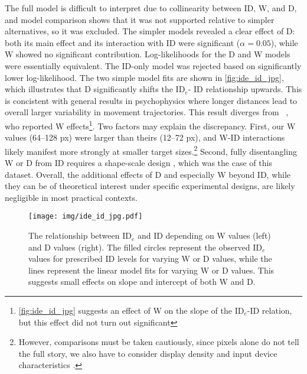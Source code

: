 \documentclass[acmlarge, manuscript,review]{acmart}
\newcommand{\ide}{\ensuremath{{\text{ID}_e}}\xspace}
\begin{document}
The full model is difficult to interpret due to collinearity between ID, W, and D, and model comparison shows that it was not supported relative to simpler alternatives, so it was excluded. The simpler models revealed a clear effect of D: both its main effect and its interaction with ID were significant ($\alpha=0.05$), while W showed no significant contribution. Log-likelihoods for the D and W models were essentially equivalent. The ID-only model was rejected based on significantly lower log-likelihood.
The two simple model fits are shown in \autoref{fig:ide_id_jpg}, which illustrates that D significantly shifts the \ide - ID relationship upwards. This is concistent with general results in psychophysics where longer distances lead to overall larger variability in movement trajectories. 
This result diverges from \citeauthor{zhai2004nominal}~\cite{zhai2004nominal}, who reported W effects\footnote{\autoref{fig:ide_id_jpg} suggests an effect of W on the slope of the \ide-ID relation, but this effect did not turn out significant}. Two factors may explain the discrepancy. First, our W values (64--128 px) were larger than theirs (12--72 px), and W-ID interactions likely manifest more strongly at smaller target sizes.\footnote{However, comparisons must be taken cautiously, since pixels alone do not tell the full story, we also have to consider display density and input device characteristics \cite{casiez2011}.} Second, fully disentangling W or D from ID requires a shape-scale design \cite{gori2018chi, guiard2009}, which was the case of this dataset.
Overall, the additional effects of D and especially W beyond ID, while they can be of theoretical interest under specific experimental designs, are likely negligible in most practical contexts.



\begin{figure}[htbp]
	\centering
	\texttt{[image: img/ide\_id\_jpg.pdf]}
	\caption{The relationship between \ide and ID depending on W values (left) and D values (right). The filled circles represent the observed \ide values for prescribed ID levels for varying W or D values, while the lines represent the linear model fits for varying W or D values. This suggests small effects on slope and intercept of both W and D.}
	\label{fig:ide_id_jpg}
\end{figure}
\end{document}
